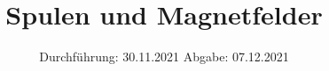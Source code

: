 

\subject{V308}
\title{Spulen und Magnetfelder}
\date{%
  Durchführung: 30.11.2021
  \hspace{3em}
  Abgabe: 07.12.2021
}



\maketitle
\thispagestyle{empty}
\tableofcontents
\newpage




\newpage

\newpage


\printbibliography{}


